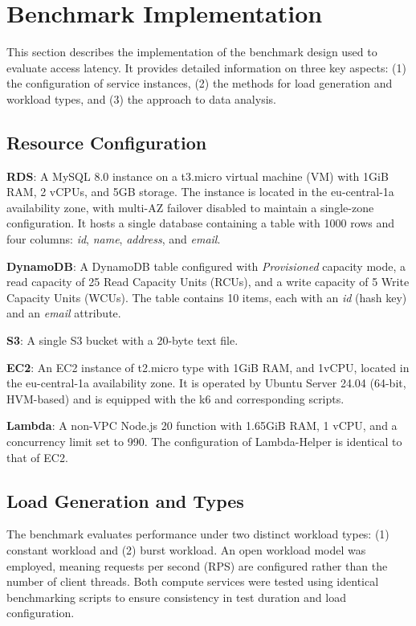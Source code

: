 \section{Benchmark Implementation}
\label{cha:implementation}

This section describes the implementation of the benchmark design used to evaluate access latency. It provides detailed information on three key aspects: (1) the configuration of service instances, (2) the methods for load generation and workload types, and (3) the approach to data analysis.

\subsection{Resource Configuration}
\label{sec:config}

\textbf{RDS}:
A MySQL 8.0 instance on a t3.micro virtual machine (VM) with 1GiB RAM, 2 vCPUs, and 5GB storage. The instance is located in the eu-central-1a availability zone, with multi-AZ failover disabled to maintain a single-zone configuration. It hosts a single database containing a table with 1000 rows and four columns: \textit{id}, \textit{name}, \textit{address}, and \textit{email}.


\textbf{DynamoDB}:
A DynamoDB table configured with \textit{Provisioned} capacity mode, a read capacity of 25 Read Capacity Units (RCUs), and a write capacity of 5 Write Capacity Units (WCUs). The table contains 10 items, each with an \textit{id} (hash key) and an \textit{email} attribute.

\textbf{S3}:
A single S3 bucket with a 20-byte text file.

\textbf{EC2}:
An EC2 instance of t2.micro type with 1GiB RAM, and 1vCPU, located in the eu-central-1a availability zone. It is operated by Ubuntu Server 24.04 (64-bit, HVM-based) and is equipped with the k6 and corresponding scripts.

\textbf{Lambda}:
A non-VPC Node.js 20 function with 1.65GiB RAM, 1 vCPU, and a concurrency limit set to 990. The configuration of Lambda-Helper is identical to that of EC2.

\subsection{Load Generation and Types}
\label{sec:loads}

The benchmark evaluates performance under two distinct workload types: (1) constant workload and (2) burst workload. An open workload model was employed, meaning requests per second (RPS) are configured rather than the number of client threads. Both compute services were tested using identical benchmarking scripts to ensure consistency in test duration and load configuration.

